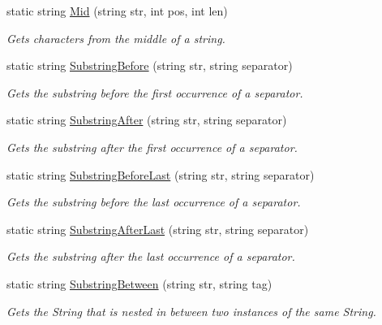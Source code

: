 \begin{DoxyCompactItemize}
static string \hyperlink{class_ultimate_1_1_utilities_1_1_string_utils_aa7da61ff9c6480bea52575f1ec37eff2}{Mid} (string str, int pos, int len)
\begin{DoxyCompactList}\small\item\em Gets characters from the middle of a string. \end{DoxyCompactList}\item 
static string \hyperlink{class_ultimate_1_1_utilities_1_1_string_utils_a5dd475e3e3e80db3c00acf01fdadee5d}{Substring\+Before} (string str, string separator)
\begin{DoxyCompactList}\small\item\em Gets the substring before the first occurrence of a separator. \end{DoxyCompactList}\item 
static string \hyperlink{class_ultimate_1_1_utilities_1_1_string_utils_a46dda17765761ce8cb3e78605eac85d7}{Substring\+After} (string str, string separator)
\begin{DoxyCompactList}\small\item\em Gets the substring after the first occurrence of a separator. \end{DoxyCompactList}\item 
static string \hyperlink{class_ultimate_1_1_utilities_1_1_string_utils_ab9271a61df26b67288101e52330d4a4a}{Substring\+Before\+Last} (string str, string separator)
\begin{DoxyCompactList}\small\item\em Gets the substring before the last occurrence of a separator. \end{DoxyCompactList}\item 
static string \hyperlink{class_ultimate_1_1_utilities_1_1_string_utils_ad8851f1cd4d3b5af3d775a3495e6e379}{Substring\+After\+Last} (string str, string separator)
\begin{DoxyCompactList}\small\item\em Gets the substring after the last occurrence of a separator. \end{DoxyCompactList}\item 
static string \hyperlink{class_ultimate_1_1_utilities_1_1_string_utils_acf074f1809409253af1479e800c8d52a}{Substring\+Between} (string str, string tag)
\begin{DoxyCompactList}\small\item\em Gets the String that is nested in between two instances of the same String. \end{DoxyCompactList}\item 

\end{DoxyCompactItemize}
